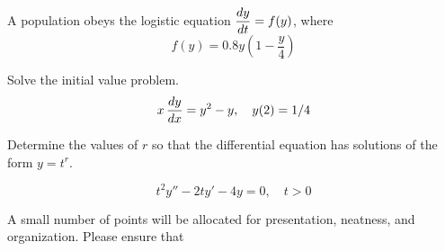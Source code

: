 \documentclass[12pt]{exam}
\begin{document}
    


\newpage

\begin{questions}




    \newpage
    \question[9] A population obeys the logistic equation $\displaystyle {\frac{dy}{dt}} = f(y)$, where $$f(y) = 0.8y\left(1 - \frac{y}{4}\right)$$ %

\newpage 

\question[6] Solve the initial value problem. $$x \, {\frac{dy}{dx}} = y^2 - y, \quad y(2) = 1/4$$

 \vspace{8cm}
 
\newpage 

\question[4] Determine the values of $r$ so that the differential equation has solutions of the form $y=t^r$. 

$$t^2y'' - 2ty' - 4y =0, \quad t>0$$ 

\newpage

    \question[1] A small number of points will be allocated for presentation, neatness, and organization. Please ensure that
    \begin{parts}

\end{parts}
\end{questions}
\end{document}
